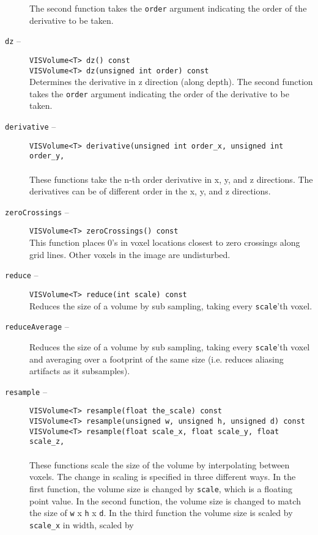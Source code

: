 \begin{description}
The second function takes the {\tt order} argument indicating
the order of the derivative to be taken.
\item[{\tt dz} --]
{\tt VISVolume<T> dz() const}\\
{\tt VISVolume<T> dz(unsigned int order) const}\\
Determines the derivative in z direction (along depth).
The second function takes the {\tt order} argument indicating
the order of the derivative to be taken.
\item[{\tt derivative} --]
{\tt VISVolume<T> derivative(unsigned int order\_x, unsigned int order\_y,}\\
\hspace*{0.25in}{\tt unsigned int order\_z) const}\\
These functions take the n-th order derivative in x, y, and z directions.
The derivatives can be of different order in the x, y, and z directions.
\item[{\tt zeroCrossings} --]
{\tt VISVolume<T> zeroCrossings() const}\\
This function places 0's in voxel locations closest to zero crossings
along grid lines.  Other voxels in the image are undisturbed.
\item[{\tt reduce} --]
{\tt VISVolume<T> reduce(int scale) const}\\
Reduces the size of a volume by sub sampling, taking every {\tt scale}'th voxel.
\item[{\tt reduceAverage} --]
Reduces the size of a volume by sub sampling, taking every {\tt scale}'th 
voxel and averaging over a footprint of the same size (i.e. reduces 
aliasing artifacts as it subsamples).
\item[{\tt resample} --]
{\tt VISVolume<T> resample(float the\_scale) const}\\
{\tt VISVolume<T> resample(unsigned w, unsigned h, unsigned d) const}\\
{\tt VISVolume<T> resample(float scale\_x, float scale\_y, float scale\_z,}\\
\hspace*{0.25in}{\tt float x, float y, float z) const}\\
These functions scale the size of the volume by interpolating between
voxels.  The change in scaling is specified in three different ways.
In the first function, the volume size is changed by {\tt scale}, which
is a floating point value.  In the second function, the volume size
is changed to match the size of {\tt w} x {\tt h} x {\tt d}.  In the third
function the volume size is scaled by {\tt scale\_x} in width, scaled by

\end{description}

